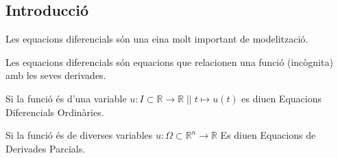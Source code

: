 \documentclass[../main.tex]{subfiles}
\begin{document}
\setcounter{subsection}{-1}
\subsection{Introducció}
Les equacions diferencials són una eina molt important de modelització.
\begin{definicio}
    Les equacions diferencials són equacions que relacionen una funció (incògnita) amb les seves
    derivades.
\end{definicio}
\begin{definicio}
    Si la funció és d'una variable $u: I \subset \mathbb{R} \rightarrow \mathbb{R}\;||\;t \mapsto u(t)$
    es diuen Equacions Diferencials Ordinàries.
\end{definicio}
\begin{definicio}
    Si la funció és de diverses variables $u : \Omega \subset \mathbb{R}^n \to \mathbb{R}$ Es diuen
    Equacions de Derivades Parcials.
\end{definicio}
\end{document}
